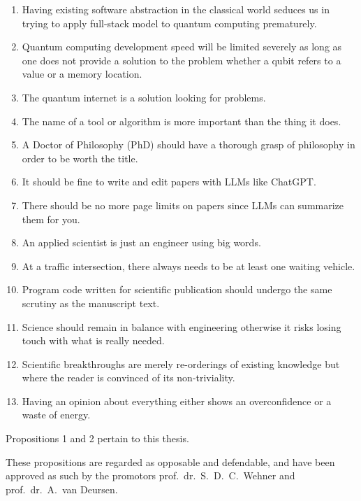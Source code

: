 \begin{enumerate}[widest=10]
  \item Having existing software abstraction in the classical world seduces us in trying to apply full-stack model to quantum computing prematurely.

  \item Quantum computing development speed will be limited severely as long as one does not provide a solution to the problem whether a qubit refers to a value or a memory location.

  \item The quantum internet is a solution looking for problems.

  \item The name of a tool or algorithm is more important than the thing it does.

  \item A Doctor of Philosophy (PhD) should have a thorough grasp of philosophy in order to be worth the title.

  \item It should be fine to write and edit papers with LLMs like ChatGPT.

  \item There should be no more page limits on papers since LLMs can summarize them for you.

  \item An applied scientist is just an engineer using big words.

  \item At a traffic intersection, there always needs to be at least one waiting vehicle.

  \item Program code written for scientific publication should undergo the same scrutiny as the manuscript text.

  \item Science should remain in balance with engineering otherwise it risks losing touch with what is really needed.

  \item Scientific breakthroughs are merely re-orderings of existing knowledge but where the reader is convinced of its non-triviality.

  \item Having an opinion about everything either shows an overconfidence or a waste of energy.
\end{enumerate}

\bigskip \noindent
Propositions 1 and 2 pertain to this thesis.

\bigskip \noindent
These propositions are regarded as opposable and defendable, and have been approved as such by the
promotors prof.\ dr.\ S.\ D.\ C.\ Wehner and prof.\ dr.\ A.\ van Deursen.
